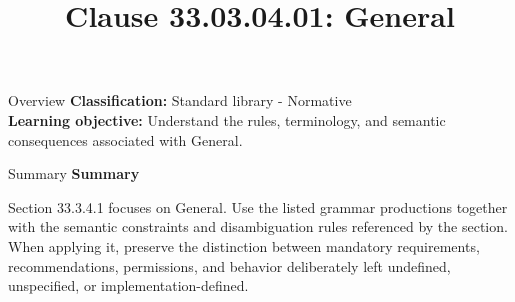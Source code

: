 \documentclass[10pt,letterpaper]{article}
\title{Clause 33.03.04.01: General}
\author{}
\date{}
\begin{document}
\maketitle
\begin{CornellOverviewBox}{Overview}
\textbf{Classification:} Standard library - Normative\\[2pt]
\textbf{Learning objective:} Understand the rules, terminology, and semantic consequences associated with General.
\end{CornellOverviewBox}\begin{CornellSummaryBox}{Summary}
{\sffamily\bfseries\color{Accent} Summary}\par\vspace{3pt}Section 33.3.4.1 focuses on General. Use the listed grammar productions together with the semantic constraints and disambiguation rules referenced by the section. When applying it, preserve the distinction between mandatory requirements, recommendations, permissions, and behavior deliberately left undefined, unspecified, or implementation-defined.
\end{CornellSummaryBox}
\end{document}
